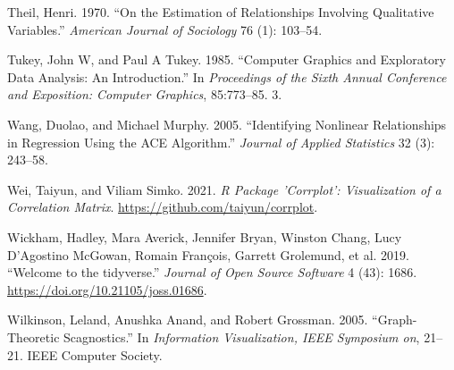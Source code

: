 \begin{CSLReferences}{1}{0}
\leavevmode{}%
Theil, Henri. 1970. {``On the Estimation of Relationships Involving Qualitative Variables.''} \emph{American Journal of Sociology} 76 (1): 103--54.

\leavevmode{}%
Tukey, John W, and Paul A Tukey. 1985. {``Computer Graphics and Exploratory Data Analysis: An Introduction.''} In \emph{Proceedings of the Sixth Annual Conference and Exposition: Computer Graphics}, 85:773--85. 3.

\leavevmode{}%
Wang, Duolao, and Michael Murphy. 2005. {``Identifying Nonlinear Relationships in Regression Using the ACE Algorithm.''} \emph{Journal of Applied Statistics} 32 (3): 243--58.

\leavevmode{}%
Wei, Taiyun, and Viliam Simko. 2021. \emph{R Package 'Corrplot': Visualization of a Correlation Matrix}. \url{https://github.com/taiyun/corrplot}.

\leavevmode{}%
Wickham, Hadley, Mara Averick, Jennifer Bryan, Winston Chang, Lucy D'Agostino McGowan, Romain François, Garrett Grolemund, et al. 2019. {``Welcome to the {tidyverse}.''} \emph{Journal of Open Source Software} 4 (43): 1686. \url{https://doi.org/10.21105/joss.01686}.

\leavevmode{}%
Wilkinson, Leland, Anushka Anand, and Robert Grossman. 2005. {``Graph-Theoretic Scagnostics.''} In \emph{Information Visualization, IEEE Symposium on}, 21--21. IEEE Computer Society.

\end{CSLReferences}



\address{%
Amit Chinwan\\
Maynooth University\\%
Hamilton Institute\\ Maynooth, Ireland\\
%
%
%
\href{mailto:amit.chinwan.2019@mumail.ie}{\nolinkurl{amit.chinwan.2019@mumail.ie}}%
}

\address{%
Catherine Hurley\\
Maynooth University\\%
Department of Mathematics and Statistics\\ Maynooth, Ireland\\
%
%
%
\href{mailto:catherine.hurley@mu.ie}{\nolinkurl{catherine.hurley@mu.ie}}%
}
